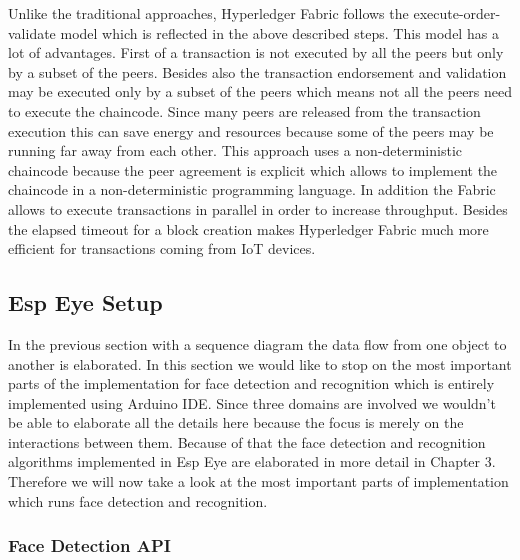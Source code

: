  Unlike the traditional approaches, Hyperledger Fabric follows the execute-order-validate model which is reflected in the above described steps. This model has a lot of advantages. First of a transaction is not executed by all the peers but only by a subset of the peers. Besides also the transaction endorsement and validation may be executed only by a subset of the peers which means not all the peers need to execute the chaincode. Since many peers are released from the transaction execution this can save energy and resources because some of the peers may be running far away from each other. 
 This approach uses a non-deterministic chaincode because the peer agreement is explicit  which allows to implement the chaincode in a non-deterministic programming language. In addition the Fabric allows to execute transactions in parallel in order to increase throughput. Besides the elapsed timeout for a block creation makes Hyperledger Fabric much more efficient for transactions coming from IoT devices.
 
 
 
\subsection{Esp Eye Setup}

In the previous section with a sequence diagram the data flow from one object to another is elaborated. In this section we would like to stop on the most important parts of the implementation for face detection and recognition which is entirely implemented using Arduino IDE. Since three domains are involved we wouldn't be able to elaborate all the details here because the focus is merely on the interactions between them. Because of that the face detection and recognition algorithms implemented in Esp Eye are elaborated in more detail in Chapter 3. Therefore we will now take a look at the most important parts of implementation which runs face detection and recognition.


\subsubsection{Face Detection API} 

